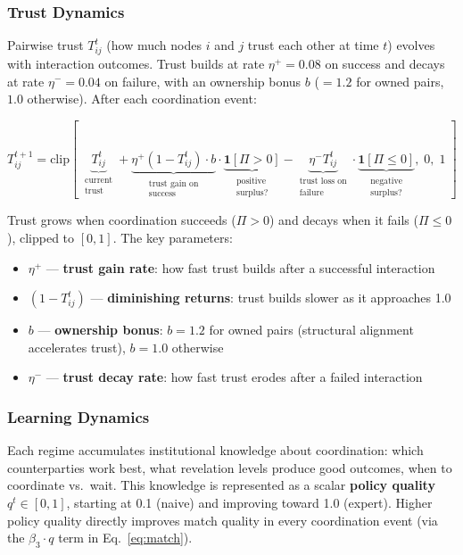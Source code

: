 \documentclass[12pt]{article}
\theoremstyle{definition}
\begin{document}
\subsubsection{Trust Dynamics}

Pairwise trust $T_{ij}^t$ (how much nodes $i$ and $j$ trust each other at time $t$) evolves with interaction outcomes. Trust builds at rate $\eta^+ = 0.08$ on success and decays at rate $\eta^- = 0.04$ on failure, with an ownership bonus $b$ ($= 1.2$ for owned pairs, $1.0$ otherwise). After each coordination event:

\begin{equation}
T_{ij}^{t+1} = \text{clip}\!\left[\;
\underbrace{T_{ij}^t}_{\substack{\text{current} \\ \text{trust}}}
+ \underbrace{\eta^+ (1 - T_{ij}^t) \cdot b}_{\substack{\text{trust gain on} \\ \text{success}}} \cdot \underbrace{\mathbf{1}[\Pi > 0]}_{\substack{\text{positive} \\ \text{surplus?}}}
- \underbrace{\eta^- T_{ij}^t}_{\substack{\text{trust loss on} \\ \text{failure}}} \cdot \underbrace{\mathbf{1}[\Pi \leq 0]}_{\substack{\text{negative} \\ \text{surplus?}}}
,\; 0,\; 1\;\right]
\end{equation}

\noindent Trust grows when coordination succeeds ($\Pi > 0$) and decays when it fails ($\Pi \leq 0$), clipped to $[0,1]$. The key parameters:
\begin{itemize}[leftmargin=*]
\item $\eta^+$ --- \textbf{trust gain rate}: how fast trust builds after a successful interaction
\item $(1 - T_{ij}^t)$ --- \textbf{diminishing returns}: trust builds slower as it approaches 1.0
\item $b$ --- \textbf{ownership bonus}: $b = 1.2$ for owned pairs (structural alignment accelerates trust), $b = 1.0$ otherwise
\item $\eta^-$ --- \textbf{trust decay rate}: how fast trust erodes after a failed interaction
\end{itemize}

\subsubsection{Learning Dynamics}
\label{sec:learning}

Each regime accumulates institutional knowledge about coordination: which counterparties work best, what revelation levels produce good outcomes, when to coordinate vs.\ wait. This knowledge is represented as a scalar \textbf{policy quality} $q^t \in [0,1]$, starting at 0.1 (naive) and improving toward 1.0 (expert). Higher policy quality directly improves match quality in every coordination event (via the $\beta_3 \cdot q$ term in Eq.~\ref{eq:match}).
\end{document}
